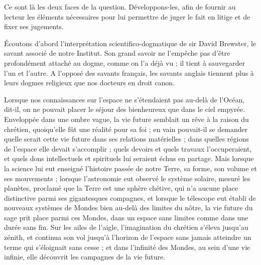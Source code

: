 \documentclass[a4paper, 11pt, oneside, landscape]{article}
\begin{document}
Ce sont là les deux faces de la question. Développons-les, afin de fournir au lecteur les éléments nécessaires pour lui permettre de juger le fait en litige et de fixer ses jugements.

Écoutons d'abord l'interprétation scientifico-dogmatique de sir David Brewster, le savant associé de notre Institut. Son grand savoir ne l'empêche pas d'être profondément attaché au dogme, comme on l'a déjà vu ; il tient à sauvegarder l'un et l'autre. A l'opposé des savants français, les savants anglais tiennent plus à leurs dogmes religieux que nos docteurs en droit canon.

Lorsque nos connaissances sur l'espace ne s'étendaient pas au-delà de l'Océan, dit-il, on ne pouvait placer le séjour des bienheureux que dans le ciel empyrée. Enveloppée dans une ombre vague, la vie future semblait un rêve à la raison du chrétien, quoiqu'elle fût une réalité pour sa foi ; en vain pouvait-il se demander quelle serait cette vie future dans ses relations matérielles ; dans quelles régions de l'espace elle devait s'accomplir ; quels devoirs et quels travaux l'occuperaient, et quels dons intellectuels et spirituels lui seraient échus en partage. Mais lorsque la science lui eut enseigné l'histoire passée de notre Terre, sa forme, son volume et ses mouvements ; lorsque l'astronomie eut observé le système solaire, mesuré les planètes, proclamé que la Terre est une sphère chétive, qui n'a aucune place distinctive parmi ses gigantesques compagnes, et lorsque le télescope eut établi de nouveaux systèmes de Mondes bien au-delà des limites du nôtre, la vie future du sage prit place parmi ces Mondes, dans un espace sans limites comme dans une durée sans fin. Sur les ailes de l'aigle, l'imagination du chrétien s'éleva jusqu'au zénith, et continua son vol jusqu'à l'horizon de l'espace sans jamais atteindre un terme qui s'éloignait sans cesse ; et dans l'infinité des Mondes, au sein d'une vie infinie, elle découvrit les campagnes de la vie future.
\end{document}
